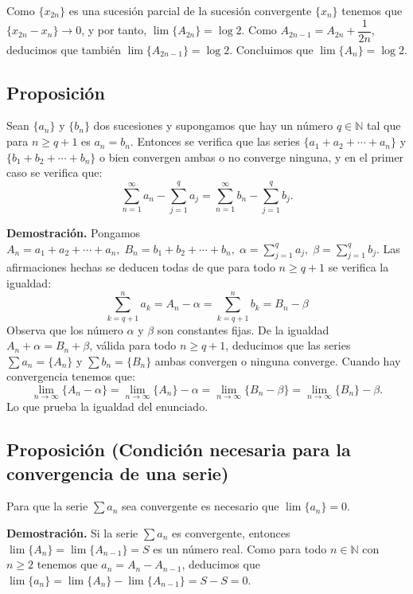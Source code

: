 \documentclass[10pt,a4paper]{article}
\begin{document}
	Como $\{x_{2n}\}$ es una sucesión parcial de la sucesión convergente $\{x_n\}$ tenemos que $\{x_{2n} - x_n\} \rightarrow 0$, y por tanto, $\lim\{A_{2n}\} = \log 2$. Como $A_{2n-1} = A_{2n} + \dfrac{1}{2n}$, deducimos que también $\lim\{A_{2n-1}\} = \log 2$. Concluimos que $\lim\{A_n\} = \log 2$.
	
	
	\subsection{Proposición}
	Sean $\{a_n\}$ y $\{b_n\}$ dos sucesiones y supongamos que hay un número $q \in \mathbb{N}$ tal que para $n \geq q + 1$ es $a_n = b_n$. Entonces se verifica que las series $\{a_1 + a_2 + \cdots + a_n\}$ y $\{b_1 + b_2 + \cdots + b_n\}$ o bien convergen ambas o no converge ninguna, y en el primer caso se verifica que:
	$$\sum_{n = 1}^\infty a_n - \sum_{j = 1}^{q} a_j = \sum_{n = 1}^{\infty}b_n - \sum_{j = 1}^{q}b_j.$$
	
	\textbf{Demostración. }Pongamos $A_n = a_1 + a_2 + \cdots + a_n, \; B_n = b_1 + b_2 + \cdots + b_n, \; \alpha = \sum_{j = 1}^{q} a_j, \; \beta = \sum_{j = 1} ^{q} b_j$. Las afirmaciones hechas se deducen todas de que para todo $n \geq q + 1$ se verifica la igualdad:
	$$ \sum_{k = q+1} ^n a_k = A_n - \alpha = \sum_{k = q+1}^n b_k = B_n - \beta$$
	Observa que los número $\alpha$ y $\beta$ son constantes fijas. De la igualdad $A_n + \alpha = B_n + \beta$, válida para todo $n \geq q +1$, deducimos que las series $\sum a_n = \{A_n\}$ y $\sum b_n = \{B_n\}$ ambas convergen o ninguna converge. Cuando hay convergencia tenemos que:
	$$ \lim_{n \rightarrow \infty} \{A_n - \alpha\} = \lim_{n \rightarrow \infty} \{A_n\} - \alpha = \lim_{n \rightarrow \infty}\{B_n - \beta\} = \lim_{n \rightarrow \infty}\{B_n\} -\beta.$$
	Lo que prueba la igualdad del enunciado.
	
	\subsection{Proposición (Condición necesaria para la convergencia de una serie)}
	
	Para que la serie $\sum a_n$ sea convergente es necesario que $\lim\{a_n\} = 0$.
	
	\textbf{Demostración. }Si la serie $\sum a_n$ es convergente, entonces $\lim\{A_n\} = \lim\{A_{n-1}\} = S$ es un número real. Como para todo $n \in \mathbb{N}$ con $n \geq 2$ tenemos que $a_n = A_n - A_{n-1}$, deducimos que $\lim\{a_n\} = \lim\{A_n\} - \lim\{A_{n-1}\} = S-S = 0$.
	
\end{document}
